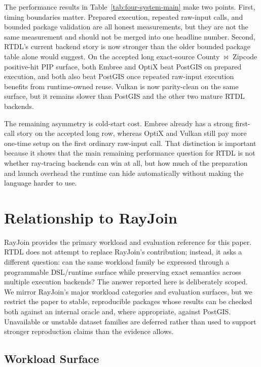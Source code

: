 \documentclass[conference]{IEEEtran}
\begin{document}
The performance results in Table~\ref{tab:four-system-main} make two points.
First, timing boundaries matter. Prepared execution, repeated raw-input calls,
and bounded package validation are all honest measurements, but they are not
the same measurement and should not be merged into one headline number.
Second, RTDL's current backend story is now stronger than the older bounded
package table alone would suggest. On the accepted long exact-source County
$\bowtie$ Zipcode positive-hit PIP surface, both Embree and OptiX beat
PostGIS on prepared execution, and both also beat PostGIS once repeated
raw-input execution benefits from runtime-owned reuse. Vulkan is now
parity-clean on the same surface, but it remains slower than PostGIS and the
other two mature RTDL backends.

The remaining asymmetry is cold-start cost. Embree already has a strong
first-call story on the accepted long row, whereas OptiX and Vulkan still pay
more one-time setup on the first ordinary raw-input call. That distinction is
important because it shows that the main remaining performance question for
RTDL is not whether ray-tracing backends can win at all, but how much of the
preparation and launch overhead the runtime can hide automatically without
making the language harder to use.

\section{Relationship to RayJoin}

RayJoin provides the primary workload and evaluation reference for this paper.
RTDL does not attempt to replace RayJoin's contribution; instead, it asks a
different question: can the same workload family be expressed through a
programmable DSL/runtime surface while preserving exact semantics across
multiple execution backends? The answer reported here is deliberately scoped.
We mirror RayJoin's major workload categories and evaluation surfaces, but we
restrict the paper to stable, reproducible packages whose results can be
checked both against an internal oracle and, where appropriate, against
PostGIS. Unavailable or unstable dataset families are deferred rather than used
to support stronger reproduction claims than the evidence allows.

\subsection{Workload Surface}
\end{document}
